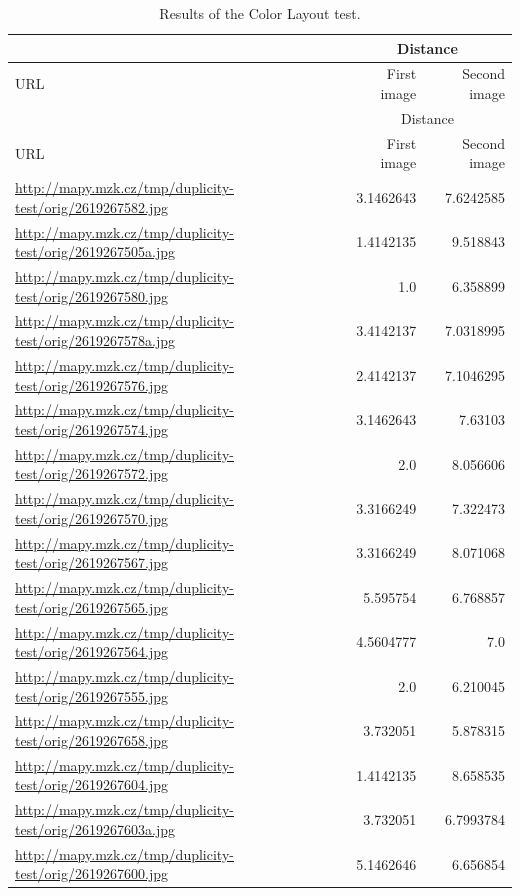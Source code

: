 \documentclass[12pt,a4paper]{report}
\begin{document}
\begin{center}
\begin{longtable}{|m{7cm}|r|r|}

\caption{Results of the Color Layout test.} \label{tab:colorLayoutTest}\\

\hline
& \multicolumn{2}{c|}{Distance} \\
\hline
URL & First image & Second image \\
\hline
\endfirsthead
\hline
& \multicolumn{2}{c|}{Distance} \\
\hline
URL & First image & Second image \\
\hline
\endhead
\endfoot
\endlastfoot
\url{http://mapy.mzk.cz/tmp/duplicity-test/orig/2619267582.jpg} & 3.1462643 & 7.6242585\\
\hline
\url{http://mapy.mzk.cz/tmp/duplicity-test/orig/2619267505a.jpg} & 1.4142135 & 9.518843\\
\hline
\url{http://mapy.mzk.cz/tmp/duplicity-test/orig/2619267580.jpg} & 1.0 & 6.358899\\
\hline
\url{http://mapy.mzk.cz/tmp/duplicity-test/orig/2619267578a.jpg} & 3.4142137 & 7.0318995\\
\hline
\url{http://mapy.mzk.cz/tmp/duplicity-test/orig/2619267576.jpg} & 2.4142137 & 7.1046295\\
\hline
\url{http://mapy.mzk.cz/tmp/duplicity-test/orig/2619267574.jpg} & 3.1462643 & 7.63103\\
\hline
\url{http://mapy.mzk.cz/tmp/duplicity-test/orig/2619267572.jpg} & 2.0 & 8.056606\\
\hline
\url{http://mapy.mzk.cz/tmp/duplicity-test/orig/2619267570.jpg} & 3.3166249 & 7.322473\\
\hline
\url{http://mapy.mzk.cz/tmp/duplicity-test/orig/2619267567.jpg} & 3.3166249 & 8.071068\\
\hline
\url{http://mapy.mzk.cz/tmp/duplicity-test/orig/2619267565.jpg} & 5.595754 & 6.768857\\
\hline
\url{http://mapy.mzk.cz/tmp/duplicity-test/orig/2619267564.jpg} & 4.5604777 & 7.0\\
\hline
\url{http://mapy.mzk.cz/tmp/duplicity-test/orig/2619267555.jpg} & 2.0 & 6.210045\\
\hline
\url{http://mapy.mzk.cz/tmp/duplicity-test/orig/2619267658.jpg} & 3.732051 & 5.878315\\
\hline
\url{http://mapy.mzk.cz/tmp/duplicity-test/orig/2619267604.jpg} & 1.4142135 & 8.658535\\
\hline
\url{http://mapy.mzk.cz/tmp/duplicity-test/orig/2619267603a.jpg} & 3.732051 & 6.7993784\\
\hline
\url{http://mapy.mzk.cz/tmp/duplicity-test/orig/2619267600.jpg} & 5.1462646 & 6.656854\\
\hline
\end{longtable}
\end{center}
\end{document}
